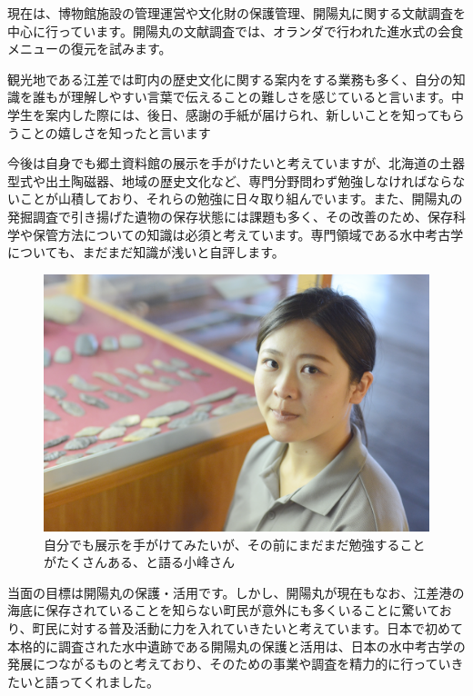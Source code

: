 \documentclass[a4j,11pt,twocolumn,openany]{jsbook}
\begin{document}
現在は、博物館施設の管理運営や文化財の保護管理、開陽丸に関する文献調査を中心に行っています。開陽丸の文献調査では、オランダで行われた進水式の会食メニューの復元を試みます。

観光地である江差では町内の歴史文化に関する案内をする業務も多く、自分の知識を誰もが理解しやすい言葉で伝えることの難しさを感じていると言います。中学生を案内した際には、後日、感謝の手紙が届けられ、新しいことを知ってもらうことの嬉しさを知ったと言います

今後は自身でも郷土資料館の展示を手がけたいと考えていますが、北海道の土器型式や出土陶磁器、地域の歴史文化など、専門分野問わず勉強しなければならないことが山積しており、それらの勉強に日々取り組んでいます。また、開陽丸の発掘調査で引き揚げた遺物の保存状態には課題も多く、その改善のため、保存科学や保管方法についての知識は必須と考えています。専門領域である水中考古学についても、まだまだ知識が浅いと自評します。

\begin{figure}[ht]
	\centering
	\includegraphics[width=\linewidth]{fig/02_Komine/Komine02.png}
	\caption{自分でも展示を手がけてみたいが、その前にまだまだ勉強することがたくさんある、と語る小峰さん}
	\label{}
	\vspace{-1\baselineskip}
\end{figure}

当面の目標は開陽丸の保護・活用です。しかし、開陽丸が現在もなお、江差港の海底に保存されていることを知らない町民が意外にも多くいることに驚いており、町民に対する普及活動に力を入れていきたいと考えています。日本で初めて本格的に調査された水中遺跡である開陽丸の保護と活用は、日本の水中考古学の発展につながるものと考えており、そのための事業や調査を精力的に行っていきたいと語ってくれました。　
\end{document}
